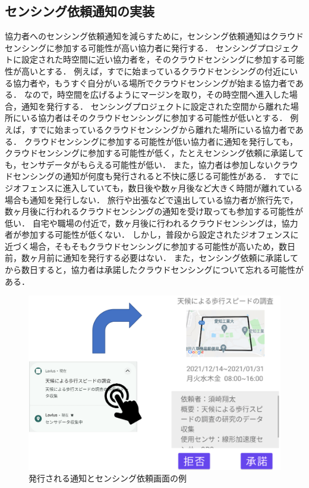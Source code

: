 \subsection{センシング依頼通知の実装}
\label{myApp_notify}
協力者へのセンシング依頼通知を減らすために，センシング依頼通知はクラウドセンシングに参加する可能性が高い協力者に発行する．
センシングプロジェクトに設定された時空間に近い協力者を，そのクラウドセンシングに参加する可能性が高いとする．
例えば，すでに始まっているクラウドセンシングの付近にいる協力者や，もうすぐ自分がいる場所でクラウドセンシングが始まる協力者である．
なので，時空間を広げるようにマージンを取り，その時空間へ進入した場合，通知を発行する．
センシングプロジェクトに設定された空間から離れた場所にいる協力者はそのクラウドセンシングに参加する可能性が低いとする．
例えば，すでに始まっているクラウドセンシングから離れた場所にいる協力者である．
クラウドセンシングに参加する可能性が低い協力者に通知を発行しても，クラウドセンシングに参加する可能性が低く，たとえセンシング依頼に承諾しても，センサデータがもらえる可能性が低い．
また，協力者は参加しないクラウドセンシングの通知が何度も発行されると不快に感じる可能性がある．
すでにジオフェンスに進入していても，数日後や数ヶ月後など大きく時間が離れている場合も通知を発行しない．
旅行や出張などで遠出している協力者が旅行先で，数ヶ月後に行われるクラウドセンシングの通知を受け取っても参加する可能性が低い．
自宅や職場の付近で，数ヶ月後に行われるクラウドセンシングは，協力者が参加する可能性が低くない．
しかし，普段から設定されたジオフェンスに近づく場合，そもそもクラウドセンシングに参加する可能性が高いため，数日前，数ヶ月前に通知を発行する必要はない．
また，センシング依頼に承諾してから数日すると，協力者は承諾したクラウドセンシングについて忘れる可能性がある．

\begin{figure}[tbh]
    \centering
    \includegraphics[width=16cm]{img_notify.png}
    \caption{発行される通知とセンシング依頼画面の例}
    \label{fig:notify}
\end{figure}


